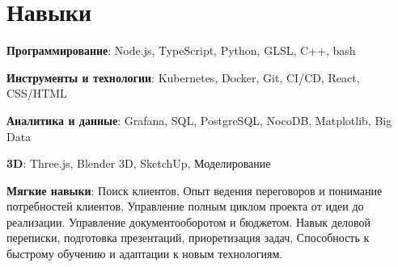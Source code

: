 \documentclass[letterpaper,9pt]{article}
\begin{document}
\section{Навыки}
\begin{itemize}[leftmargin=0.15in, label={}]
\small{\item{
\textbf{Программирование}{: Node.js, TypeScript, Python, GLSL, C++, bash}}}
\small{\item{
\textbf{Инструменты и технологии}{: Kubernetes, Docker, Git, CI/CD, React, CSS/HTML}}}
\small{\item{
\textbf{Аналитика и данные}{: Grafana, SQL, PostgreSQL, NocoDB, Matplotlib, Big Data}}}
\small{\item{
\textbf{3D}{: Three.js, Blender 3D, SketchUp, Моделирование}}}
\small{\item{
\textbf{Мягкие навыки}{: Поиск клиентов, Опыт ведения переговоров и понимание потребностей клиентов, Управление полным циклом проекта от идеи до реализации. Управление документооборотом и бюджетом. Навык деловой переписки, подготовка презентаций, приоретизация задач, Способность к быстрому обучению и адаптации к новым технологиям.}}}
\end{itemize}
\end{document}
